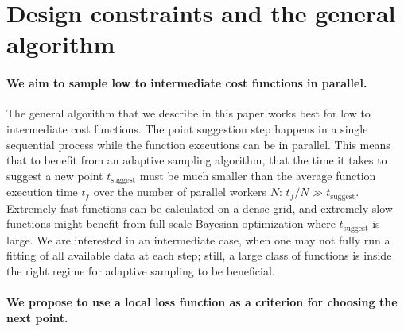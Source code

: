 \hypertarget{design-constraints-and-the-general-algorithm}{%
\section{Design constraints and the general algorithm}\label{design-constraints-and-the-general-algorithm}}

\hypertarget{we-aim-to-sample-low-to-intermediate-cost-functions-in-parallel.}{%
\paragraph{We aim to sample low to intermediate cost functions in parallel.}\label{we-aim-to-sample-low-to-intermediate-cost-functions-in-parallel.}}

The general algorithm that we describe in this paper works best for low to intermediate cost functions.
The point suggestion step happens in a single sequential process while the function executions can be in parallel.
This means that to benefit from an adaptive sampling algorithm, that the time it takes to suggest a new point $t_\textrm{suggest}$ must be much smaller than the average function execution time $t_f$ over the number of parallel workers $N$: $t_f / N \gg t_\textrm{suggest}$.
Extremely fast functions can be calculated on a dense grid, and extremely slow functions might benefit from full-scale Bayesian optimization where $t_\textrm{suggest}$ is large.
We are interested in an intermediate case, when one may not fully run a fitting of all available data at each step; still, a large class of functions is inside the right regime for adaptive sampling to be beneficial.

\hypertarget{we-propose-to-use-a-local-loss-function-as-a-criterion-for-choosing-the-next-point.}{%
\paragraph{We propose to use a local loss function as a criterion for choosing the next point.}\label{we-propose-to-use-a-local-loss-function-as-a-criterion-for-choosing-the-next-point.}}

